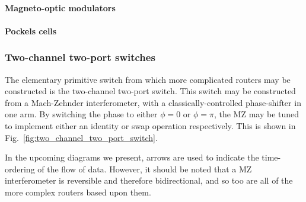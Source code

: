 

%
%

\paragraph{Magneto-optic modulators} 



%
%

\paragraph{Pockels cells} 



%
%

\subsubsection{Two-channel two-port switches} 

The elementary primitive switch from which more complicated routers may be constructed is the two-channel two-port switch. This switch may be constructed from a Mach-Zehnder interferometer, with a classically-controlled phase-shifter in one arm. By switching the phase to either \mbox{$\phi=0$} or \mbox{$\phi=\pi$}, the MZ may be tuned to implement either an identity or swap operation respectively. This is shown in Fig.~\ref{fig:two_channel_two_port_switch}.

In the upcoming diagrams we present, arrows are used to indicate the time-ordering of the flow of data. However, it should be noted that a MZ interferometer is reversible and therefore bidirectional, and so too are all of the more complex routers based upon them.

